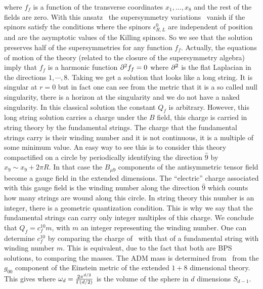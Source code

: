 where $f_f$ is a function of the transverse coordinates
$x_1,...,x_8$ and  the rest of the fields are zero.
With this ansatz \fundstr\ the supersymmetry variations
\susya\ vanish if the spinors satisfy the conditions
\eqn{}
where the spinors $ \epsilon^0_{R,L}$ are independent of
position and are  the asymptotic values of the
Killing spinors. So we see that the solution 
preserves  half of the  supersymmetries for any function $f_f$. 
Actually, the  equations of motion of the theory (related to the
closure of the supersymmetry algebra) imply
that $f_f$ is a harmonic function $ \partial^2 f_f =0$ where
$\partial^2 $ is the flat Laplacian in the directions $1,\cdots, 8$. 
Taking 
\eqn{}
we get a solution that looks like a long string. It is
singular at $r=0$ but in fact one can see from the metric
that it is a so called null singularity, 
there is a horizon at the singularity and  we
do not have a naked singularity. 
In this classical solution the
constant $Q_f$ is arbitrary. However, this long string solution 
carries a charge under the $B$ field, this charge is carried
in string theory by the fundamental strings. The charge that
the fundamental strings carry is their winding number and it is
not continuous, it
is a multiple of  some minimum value. 
An easy way to see this is to consider this theory 
compactified on a circle by  periodically 
identifying  the direction $\hat 9 $ by $ x_9  \sim x_9 + 2 \pi R $. In
that case the $ B_{\mu 9} $ components of the antisymmetric tensor
field
 become a gauge field in the extended dimensions.
The ``electric'' charge associated with this gauge field
is the winding number along the direction $\hat 9$ which counts
how many strings are wound along this circle. In string theory 
this number is 
 an integer, there is a geometric quantization 
condition. This is why we say that 
 the fundamental strings can carry 
only integer multiples of this charge.
We conclude that $Q_f  = c_f^{10} m $, with $m$ an integer representing
the winding number. One can determine $c_f^{10}$ by comparing the 
charge of \fundstr\ with that of a fundamental string with winding
number $m$. This is equivalent, due to the fact that both are
BPS solutions, to comparing the masses. 
The ADM mass is determined from \fundstr\ from the $g_{00} $ 
component of the Einstein metric of the extended 
$1+8$ dimensional theory. 
This gives
\eqn{}
where
$ \omega_d = { 2 \pi^{d/2} \over \Gamma(d/2) } $ is the
volume of the  sphere in $d$ dimensions $ S_{d-1} $.


